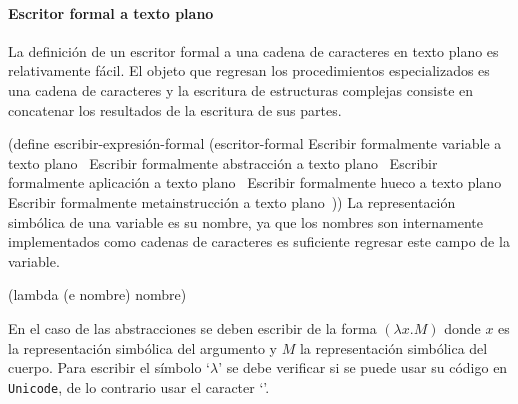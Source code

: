 \documentclass[10pt,oneside,openany,letterpaper]{book}
\begin{document}
\paragraph{Escritor formal a texto plano} La definición de un escritor formal a una cadena de caracteres en texto plano es relativamente fácil. El objeto que regresan los procedimientos especializados es una cadena de caracteres y la escritura de estructuras complejas consiste en concatenar los resultados de la escritura de sus partes.

\nwenddocs{}\endmoddef
(define escribir-expresión-formal
  (escritor-formal
   \LA{}Escribir formalmente variable a texto plano~{\nwtagstyle{}}\RA{}
   \LA{}Escribir formalmente abstracción a texto plano~{\nwtagstyle{}}\RA{}
   \LA{}Escribir formalmente aplicación a texto plano~{\nwtagstyle{}}\RA{}
   \LA{}Escribir formalmente hueco a texto plano~{\nwtagstyle{}}\RA{}
   \LA{}Escribir formalmente metainstrucción a texto plano~{\nwtagstyle{}}\RA{}))
\eatline
{}\nwendcode{}\nwdocspar
La representación simbólica de una variable es su nombre, ya que los nombres son internamente implementados como cadenas de caracteres es suficiente regresar este campo de la variable.

\nwenddocs{}\endmoddef
(lambda (e nombre) nombre)
\nwendcode{}\nwdocspar

En el caso de las abstracciones se deben escribir de la forma \( (λx.M) \) donde \( x \) es la representación simbólica del argumento y \( M \) la representación simbólica del cuerpo. Para escribir el símbolo `\( λ \)' se debe verificar si se puede usar su código en {\tt{}Unicode}, de lo contrario usar el caracter `{\tt{}{}}'.
\end{document}
